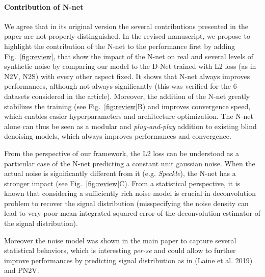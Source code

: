 \documentclass{article}
\begin{document}
\paragraph{Contribution of N-net}
We agree that in its original version the several contributions presented in the paper are not properly distinguished.
In the revised manuscript, we propose to highlight the contribution of the N-net to the performance first by adding Fig.~\ref{fig:review}, that show the impact of the N-net on real and several levels of synthetic noise by comparing our model to the D-Net trained with L2 loss (as in N2V, N2S) with every other aspect fixed.
It shows that N-net always improves performances, although not always significantly (this was verified for the 6 datasets considered in the article). Moreover, the addition of the N-net greatly stabilizes the training (see Fig.~\ref{fig:review}B) and improves convergence speed, which enables easier hyperparameters and architecture optimization.
The N-net alone can thus be seen as a modular and \textit{plug-and-play} addition to existing blind denoising models, which always improves performances and convergence.

From the perspective of our framework, the L2 loss can be understood as a particular case of the N-net predicting a constant unit gaussian noise. When the actual noise is significantly different from it (e.g. \textit{Speckle}), the N-net has a stronger impact (see Fig.~\ref{fig:review}C).
From a statistical perspective,  it is known that considering a sufficiently rich noise model is crucial in deconvolution problem to recover the signal distribution (misspecifying the noise density can lead to very poor mean integrated squared error of the deconvolution estimator of the signal distribution).

Moreover the noise model was shown in the main paper to capture several statistical behaviors, which is interesting \textit{per-se} and could allow to further improve performances by predicting signal distribution as in (Laine et al. 2019) and PN2V.
\end{document}
